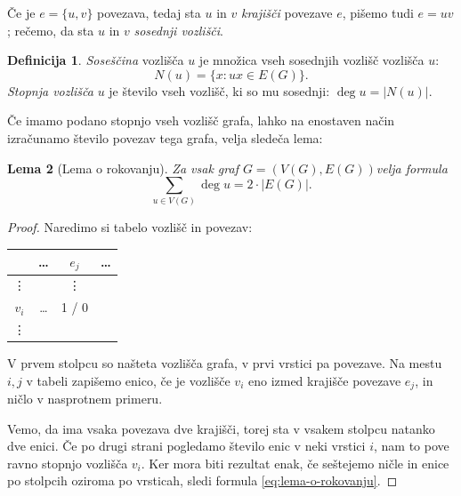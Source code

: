 \documentclass[12pt,a4paper]{amsart}
\theoremstyle{definition} %
\newtheorem{definicija}{Definicija}[section]
\theoremstyle{plain} %
\newtheorem{lema}[definicija]{Lema}
\newcommand{\graf}[1][G]{\ensuremath{#1 = (V(#1), E(#1))}}
\newcommand{\povezave}[1][G]{\ensuremath{E(#1)}}
\DeclareMathOperator {\stopnja} {deg}
\begin{document}
Če je $e = \{ u,v \}$ povezava, tedaj sta $u$ in $v$ \emph{krajišči} povezave $e$, pišemo tudi $e = uv$; rečemo, da sta $u$ in $v$ \emph{sosednji vozlišči}.

\begin{definicija}
	\emph{Soseščina} vozlišča $u$ je množica vseh sosednjih vozlišč vozlišča $u$:
	\[ N(u) = \{ x\colon ux \in \povezave \} .\]
	\emph{Stopnja vozlišča} $u$ je število vseh vozlišč, ki so mu sosednji: $\stopnja u = |N(u)|$.
\end{definicija}

Če imamo podano stopnjo vseh vozlišč grafa, lahko na enostaven način izračunamo število povezav tega grafa, velja sledeča lema:

\begin{lema}[Lema o rokovanju]
    \label{lema:rokovanje}
    Za vsak graf \graf velja formula
    \begin{equation}
        \sum_{u \in V(G)}\! \stopnja u = 2 \cdot |E(G)|.
        \label{eq:lema-o-rokovanju}
    \end{equation}
\end{lema}

\begin{proof}
    Naredimo si tabelo vozlišč in povezav:
    
    \begin{table}[h]
        \centering
        \begin{tabular}{c|ccc}
            & \ldots & $e_j$ & \ldots \\ \hline
            \vdots & & \vdots & \\
            $v_i$ & \ldots & 1 / 0 & \\
            \vdots & & &
        \end{tabular}
    \end{table}
    
    V prvem stolpcu so našteta vozlišča grafa, v prvi vrstici pa povezave. Na mestu $i,j$ v tabeli zapišemo enico, če je vozlišče $v_i$ eno izmed krajišče povezave $e_j$, in ničlo v nasprotnem primeru. 
    
    Vemo, da ima vsaka povezava dve krajišči, torej sta v vsakem stolpcu natanko dve enici. Če po drugi strani pogledamo število enic v neki vrstici $i$, nam to pove ravno stopnjo vozlišča $v_i$. Ker mora biti rezultat enak, če seštejemo ničle in enice po stolpcih oziroma po vrsticah, sledi formula \eqref{eq:lema-o-rokovanju}.
\end{proof}
\end{document}
